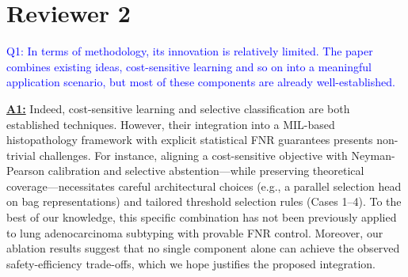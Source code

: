 \documentclass[UTF8,12pt]{article}
\begin{document}
\begin{table}[htbp]
  \centering
  \caption{The prediction performance between our model and competing models.}
\end{table}


\newpage


\section*{Reviewer 2}

\textcolor{blue}{Q1: In terms of methodology, its innovation is relatively limited. The paper combines existing ideas, cost-sensitive learning and so on into a meaningful application scenario, but most of these components are already well-established.}

\underline{{\bf A1:}} Indeed, cost-sensitive learning and selective classification are both established techniques. However, their integration into a MIL-based histopathology framework with explicit statistical FNR guarantees presents non-trivial challenges. For instance, aligning a cost-sensitive objective with Neyman-Pearson calibration and selective abstention—while preserving theoretical coverage—necessitates careful architectural choices (e.g., a parallel selection head on bag representations) and tailored threshold selection rules (Cases 1–4). To the best of our knowledge, this specific combination has not been previously applied to lung adenocarcinoma subtyping with provable FNR control. Moreover, our ablation results suggest that no single component alone can achieve the observed safety-efficiency trade-offs, which we hope justifies the proposed integration.
\end{document}
